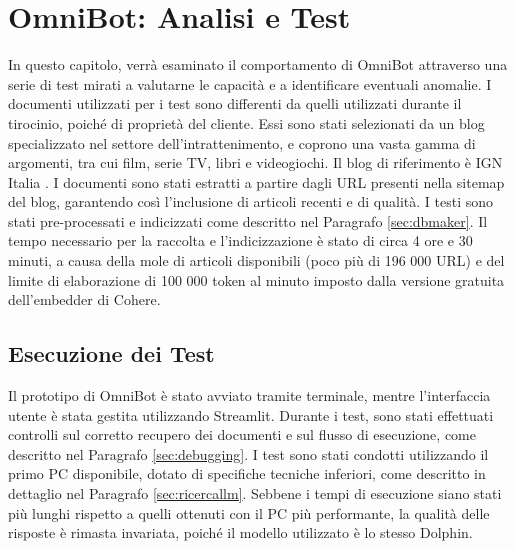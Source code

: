 \chapter{OmniBot: Analisi e Test}
In questo capitolo, verrà esaminato il comportamento di OmniBot attraverso una serie di test mirati a valutarne le capacità e a identificare eventuali anomalie. I documenti utilizzati per i test sono differenti da quelli utilizzati durante il tirocinio, poiché di proprietà del cliente. Essi sono stati selezionati da un blog specializzato nel settore dell'intrattenimento, e coprono una vasta gamma di argomenti, tra cui film, serie TV, libri e videogiochi. Il blog di riferimento è IGN Italia \cite{ignitalia}.
I documenti sono stati estratti a partire dagli URL presenti nella sitemap del blog, garantendo così l'inclusione di articoli recenti e di qualità. I testi sono stati pre-processati e indicizzati come descritto nel Paragrafo \ref{sec:dbmaker}. Il tempo necessario per la raccolta e l'indicizzazione è stato di circa 4 ore e 30 minuti, a causa della mole di articoli disponibili (poco più di 196 000 URL) e del limite di elaborazione di 100 000 token al minuto imposto dalla versione gratuita dell'embedder di Cohere.

\section{Esecuzione dei Test}
Il prototipo di OmniBot è stato avviato tramite terminale, mentre l'interfaccia utente è stata gestita utilizzando Streamlit. Durante i test, sono stati effettuati controlli sul corretto recupero dei documenti e sul flusso di esecuzione, come descritto nel Paragrafo \ref{sec:debugging}. I test sono stati condotti utilizzando il primo PC disponibile, dotato di specifiche tecniche inferiori, come descritto in dettaglio nel Paragrafo \ref{sec:ricercallm}. Sebbene i tempi di esecuzione siano stati più lunghi rispetto a quelli ottenuti con il PC più performante, la qualità delle risposte è rimasta invariata, poiché il modello utilizzato è lo stesso Dolphin.

